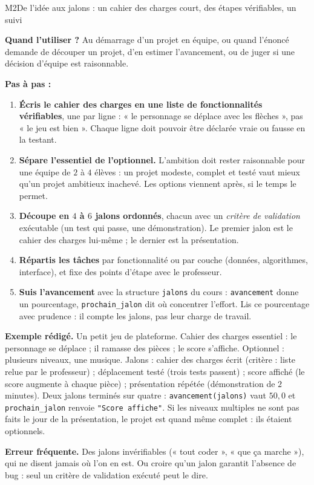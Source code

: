\begin{fichemethode}{M2}{De l'idée aux jalons : un cahier des charges court, des étapes vérifiables, un suivi}

\textbf{Quand l'utiliser ?} Au démarrage d'un projet en équipe, ou quand l'énoncé demande de
découper un projet, d'en estimer l'avancement, ou de juger si une décision d'équipe est
raisonnable.

\textbf{Pas à pas :}
\begin{enumerate}
  \item \textbf{Écris le cahier des charges en une liste de fonctionnalités vérifiables},
        une par ligne : « le personnage se déplace avec les flèches », pas « le jeu est
        bien ». Chaque ligne doit pouvoir être déclarée vraie ou fausse en la testant.
  \item \textbf{Sépare l'essentiel de l'optionnel.} L'ambition doit rester raisonnable pour
        une équipe de $2$ à $4$ élèves : un projet modeste, complet et testé vaut mieux qu'un
        projet ambitieux inachevé. Les options viennent après, si le temps le permet.
  \item \textbf{Découpe en $4$ à $6$ jalons ordonnés}, chacun avec un \emph{critère de
        validation} exécutable (un test qui passe, une démonstration). Le premier jalon est
        le cahier des charges lui-même ; le dernier est la présentation.
  \item \textbf{Répartis les tâches} par fonctionnalité ou par couche (données, algorithmes,
        interface), et fixe des points d'étape avec le professeur.
  \item \textbf{Suis l'avancement} avec la structure \lstinline{jalons} du cours :
        \lstinline{avancement} donne un pourcentage, \lstinline{prochain_jalon} dit où
        concentrer l'effort. Lis ce pourcentage avec prudence : il compte les jalons, pas
        leur charge de travail.
\end{enumerate}

\textbf{Exemple rédigé.} Un petit jeu de plateforme. Cahier des charges essentiel : le
personnage se déplace ; il ramasse des pièces ; le score s'affiche. Optionnel : plusieurs
niveaux, une musique. Jalons : cahier des charges écrit (critère : liste relue par le
professeur) ; déplacement testé (trois tests passent) ; score affiché (le score augmente à
chaque pièce) ; présentation répétée (démonstration de $2$ minutes). Deux jalons terminés
sur quatre : \lstinline{avancement(jalons)} vaut $50{,}0$ et \lstinline{prochain_jalon}
renvoie \lstinline{"Score affiche"}. Si les niveaux multiples ne sont pas faits le jour de
la présentation, le projet est quand même complet : ils étaient optionnels.

\textbf{Erreur fréquente.} Des jalons invérifiables (« tout coder », « que ça marche »), qui
ne disent jamais où l'on en est. Ou croire qu'un jalon garantit l'absence de bug : seul un
critère de validation exécuté peut le dire.

\end{fichemethode}
